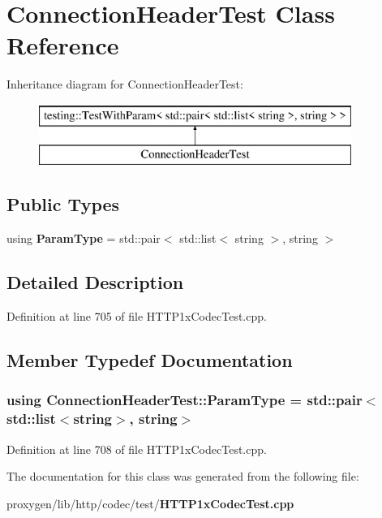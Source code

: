 \section{Connection\+Header\+Test Class Reference}
\label{classConnectionHeaderTest}
Inheritance diagram for Connection\+Header\+Test\+:\begin{figure}[H]
\begin{center}
\leavevmode
\includegraphics[height=2.000000cm]{classConnectionHeaderTest}
\end{center}
\end{figure}
\subsection*{Public Types}
\begin{DoxyCompactItemize}
\item 
using {\bf Param\+Type} = std\+::pair$<$ std\+::list$<$ string $>$, string $>$
\end{DoxyCompactItemize}


\subsection{Detailed Description}


Definition at line 705 of file H\+T\+T\+P1x\+Codec\+Test.\+cpp.



\subsection{Member Typedef Documentation}
\subsubsection[{Param\+Type}]{\setlength{\rightskip}{0pt plus 5cm}using {\bf Connection\+Header\+Test\+::\+Param\+Type} =  std\+::pair$<$std\+::list$<$string$>$, string$>$}\label{classConnectionHeaderTest_aac85e9bb383c68a69e89aeb2a502c15b}


Definition at line 708 of file H\+T\+T\+P1x\+Codec\+Test.\+cpp.



The documentation for this class was generated from the following file\+:\begin{DoxyCompactItemize}
\item 
proxygen/lib/http/codec/test/{\bf H\+T\+T\+P1x\+Codec\+Test.\+cpp}\end{DoxyCompactItemize}
